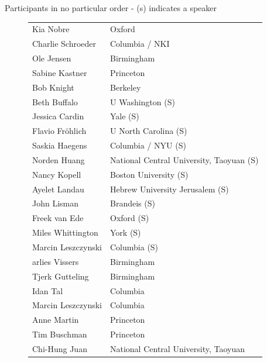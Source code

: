 \documentclass[11pt,a4paper]{article}
\begin{document}
\pagebreak

{\Large Participants in no particular order} - (s) indicates a speaker
\begin{figure}[H]
\centering
\begin{tabularx}{.95\textwidth}{l p{.8\linewidth}}

Kia Nobre & Oxford\\
Charlie Schroeder & Columbia / NKI \\
Ole Jensen & Birmingham\\
Sabine Kastner & Princeton\\
Bob Knight & Berkeley\\

Beth Buffalo & U Washington (S)\\
Jessica Cardin & Yale (S)\\
Flavio Fr{\"o}hlich & U North Carolina (S)\\
Saskia Haegens & Columbia / NYU (S)\\
Norden Huang & National Central University, Taoyuan (S)\\
Nancy Kopell & Boston University (S)\\
Ayelet Landau & Hebrew University Jerusalem (S)\\
John Lisman & Brandeis (S)\\
Freek van Ede & Oxford (S)\\
Miles Whittington & York (S)\\
Marcin Leszczynski & Columbia (S)\\

arlies Vissers & Birmingham\\
Tjerk Gutteling & Birmingham\\
Idan Tal & Columbia\\
Marcin Leszczynski & Columbia\\
Anne Martin & Princeton\\
Tim Buschman & Princeton\\
Chi-Hung Juan & National Central University, Taoyuan\\


\end{tabularx}
\end{figure}
\end{document}
